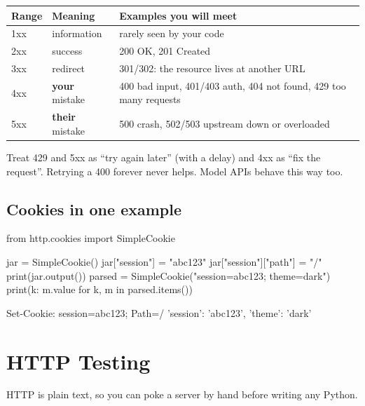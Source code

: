 \begin{center}
\begin{tabularx}{\linewidth}{@{}l l X@{}}
\toprule
\textbf{Range} & \textbf{Meaning} & \textbf{Examples you will meet} \\
\midrule
1xx & information & rarely seen by your code \\
2xx & success & 200 OK, 201 Created \\
3xx & redirect & 301/302: the resource lives at another URL \\
4xx & \textbf{your} mistake & 400 bad input, 401/403 auth, 404 not found, 429 too many requests \\
5xx & \textbf{their} mistake & 500 crash, 502/503 upstream down or overloaded \\
\bottomrule
\end{tabularx}
\end{center}

\begin{gamerule}
Treat 429 and 5xx as ``try again later'' (with a delay) and 4xx as ``fix the request''. Retrying a
400 forever never helps. Model APIs behave this way too.
\end{gamerule}

\subsection{Cookies in one example}

\begin{pycode}
from http.cookies import SimpleCookie

jar = SimpleCookie()
jar["session"] = "abc123"
jar["session"]["path"] = "/"
print(jar.output())
parsed = SimpleCookie("session=abc123; theme=dark")
print({k: m.value for k, m in parsed.items()})
\end{pycode}
\begin{rawcode}
Set-Cookie: session=abc123; Path=/
{'session': 'abc123', 'theme': 'dark'}
\end{rawcode}

\section{HTTP Testing}

HTTP is plain text, so you can poke a server by hand before writing any Python.

